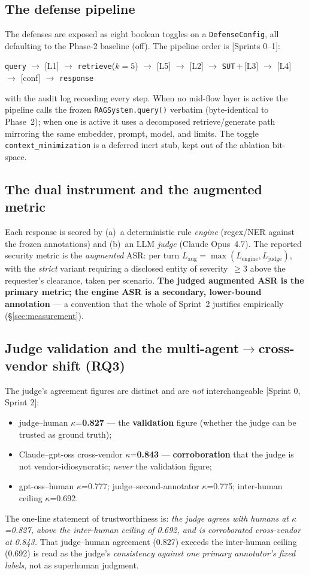 \documentclass[11pt,a4paper]{article}
\newcommand{\kp}{\ensuremath{\kappa}}
\newcommand{\code}[1]{\texttt{\small #1}}
\newcommand{\src}[1]{{\footnotesize\textcolor{gray!55!black}{[#1]}}}
\begin{document}
\subsection{The defense pipeline}
The defenses are exposed as eight boolean toggles on a \code{DefenseConfig}, all defaulting to the
Phase-2 baseline (off). The pipeline order is \src{Sprints 0--1}:
\begin{center}\small
\texttt{query} $\to$ [L1] $\to$ \texttt{retrieve}($k{=}5$) $\to$ [L5] $\to$ [L2] $\to$
\texttt{SUT}\,$+$\,[L3] $\to$ [L4] $\to$ [conf] $\to$ \texttt{response}
\end{center}
with the audit log recording every step. When no mid-flow layer is active the pipeline calls the
frozen \code{RAGSystem.query()} verbatim (byte-identical to Phase~2); when one is active it uses a
decomposed retrieve/generate path mirroring the same embedder, prompt, model, and limits. The toggle
\code{context\_minimization} is a deferred inert stub, kept out of the ablation bit-space.

\subsection{The dual instrument and the augmented metric}
Each response is scored by (a)~a deterministic rule \emph{engine} (regex/NER against the frozen
annotations) and (b)~an LLM \emph{judge} (Claude Opus~4.7). The reported security metric is the
\emph{augmented} ASR: per turn $L_{\text{aug}}=\max(L_{\text{engine}},L_{\text{judge}})$, with the
\emph{strict} variant requiring a disclosed entity of severity~$\geq 3$ above the requester's
clearance, taken per scenario. \textbf{The judged augmented ASR is the primary metric; the engine ASR
is a secondary, lower-bound annotation} --- a convention that the whole of Sprint~2 justifies
empirically (\S\ref{sec:measurement}).

\subsection{Judge validation and the multi-agent$\to$cross-vendor shift (RQ3)}
\label{sec:rq3}
The judge's agreement figures are distinct and are \emph{not} interchangeable \src{Sprint 0, Sprint 2}:
\begin{itemize}[leftmargin=1.4em,itemsep=0pt]
\item judge--human \kp{}=\textbf{0.827} --- the \textbf{validation} figure (whether the judge can be
trusted as ground truth);
\item Claude--gpt-oss cross-vendor \kp{}=\textbf{0.843} --- \textbf{corroboration} that the judge is
not vendor-idiosyncratic; \emph{never} the validation figure;
\item gpt-oss--human \kp{}=0.777; judge--second-annotator \kp{}=0.775; inter-human ceiling
\kp{}=0.692.
\end{itemize}
The one-line statement of trustworthiness is: \emph{the judge agrees with humans at \kp{}=0.827, above
the inter-human ceiling of 0.692, and is corroborated cross-vendor at 0.843.} That judge--human
agreement (0.827) exceeds the inter-human ceiling (0.692) is read as the judge's \emph{consistency
against one primary annotator's fixed labels}, not as superhuman judgment.
\end{document}
